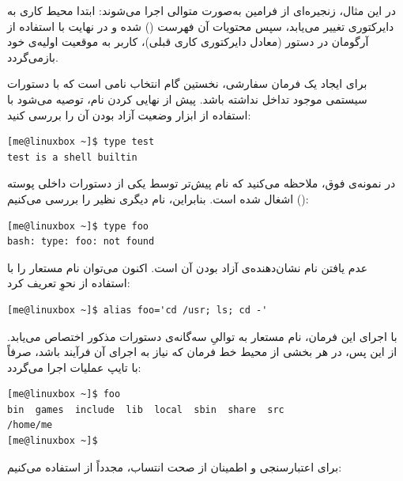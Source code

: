 در این مثال، زنجیره‌ای از فرامین به‌صورت متوالی اجرا می‌شوند: ابتدا محیط کاری به دایرکتوری  تغییر می‌یابد، سپس محتویات آن فهرست () شده و در نهایت با استفاده از آرگومان \cmd{-} در دستور  (معادل دایرکتوری کاری قبلی)، کاربر به موقعیت اولیه‌ی خود بازمی‌گردد.

برای ایجاد یک فرمان سفارشی، نخستین گام انتخاب نامی است که با دستورات سیستمی موجود تداخل نداشته باشد. پیش از نهایی کردن نام، توصیه می‌شود با استفاده از ابزار  وضعیت آزاد بودن آن را بررسی کنید:

\begin{latin}
\begin{lstlisting}
[me@linuxbox ~]$ type test
test is a shell builtin
\end{lstlisting}
\end{latin}

در نمونه‌ی فوق، ملاحظه می‌کنید که نام  پیش‌تر توسط یکی از دستورات داخلی پوسته () اشغال شده است. بنابراین، نام دیگری نظیر  را بررسی می‌کنیم:

\begin{latin}
\begin{lstlisting}
[me@linuxbox ~]$ type foo
bash: type: foo: not found
\end{lstlisting}
\end{latin}

عدم یافتن نام  نشان‌دهنده‌ی آزاد بودن آن است. اکنون می‌توان نام مستعار را با استفاده از نحوِ  تعریف کرد:

\begin{latin}
\begin{lstlisting}
[me@linuxbox ~]$ alias foo='cd /usr; ls; cd -'
\end{lstlisting}
\end{latin}

با اجرای این فرمان، نام مستعار  به توالیِ سه‌گانه‌ی دستورات مذکور اختصاص می‌یابد. از این پس، در هر بخشی از محیط خط فرمان که نیاز به اجرای آن فرآیند باشد، صرفاً با تایپ  عملیات اجرا می‌گردد:

\begin{latin}
\begin{lstlisting}
[me@linuxbox ~]$ foo
bin  games  include  lib  local  sbin  share  src
/home/me
[me@linuxbox ~]$
\end{lstlisting}
\end{latin}

برای اعتبارسنجی و اطمینان از صحت انتساب، مجدداً از  استفاده می‌کنیم:

